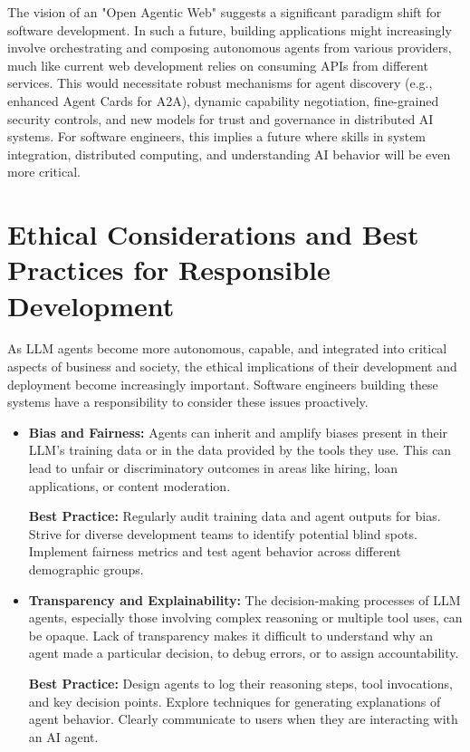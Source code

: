 The vision of an "Open Agentic Web" suggests a significant paradigm shift for software development. In such a future, building applications might 
increasingly involve orchestrating and composing autonomous agents from various providers, much like current web development relies on consuming 
APIs from different services. This would necessitate robust mechanisms for agent discovery (e.g., enhanced Agent Cards for A2A), dynamic capability negotiation, 
fine-grained security controls, and new models for trust and governance in distributed AI systems. For software engineers, this implies a future where skills in 
system integration, distributed computing, and understanding AI behavior will be even more critical.

\section{Ethical Considerations and Best Practices for Responsible Development}

As LLM agents become more autonomous, capable, and integrated into critical aspects of business and society, the ethical implications of their development 
and deployment become increasingly important. Software engineers building these systems have a responsibility to consider these issues proactively.

\begin{itemize}
    \item \textbf{Bias and Fairness:} Agents can inherit and amplify biases present in their LLM's training data or in the data provided by the tools they use. 
    This can lead to unfair or discriminatory outcomes in areas like hiring, loan applications, or content moderation.

    \textbf{Best Practice:} Regularly audit training data and agent outputs for bias. Strive for diverse development teams to identify potential blind spots. 
    Implement fairness metrics and test agent behavior across different demographic groups.

    \item \textbf{Transparency and Explainability:} The decision-making processes of LLM agents, especially those involving complex reasoning or multiple tool uses, 
    can be opaque. Lack of transparency makes it difficult to understand why an agent made a particular decision, to debug errors, or to assign accountability.

    \textbf{Best Practice:} Design agents to log their reasoning steps, tool invocations, and key decision points. Explore techniques for generating explanations 
    of agent behavior. Clearly communicate to users when they are interacting with an AI agent.
\end{itemize}
